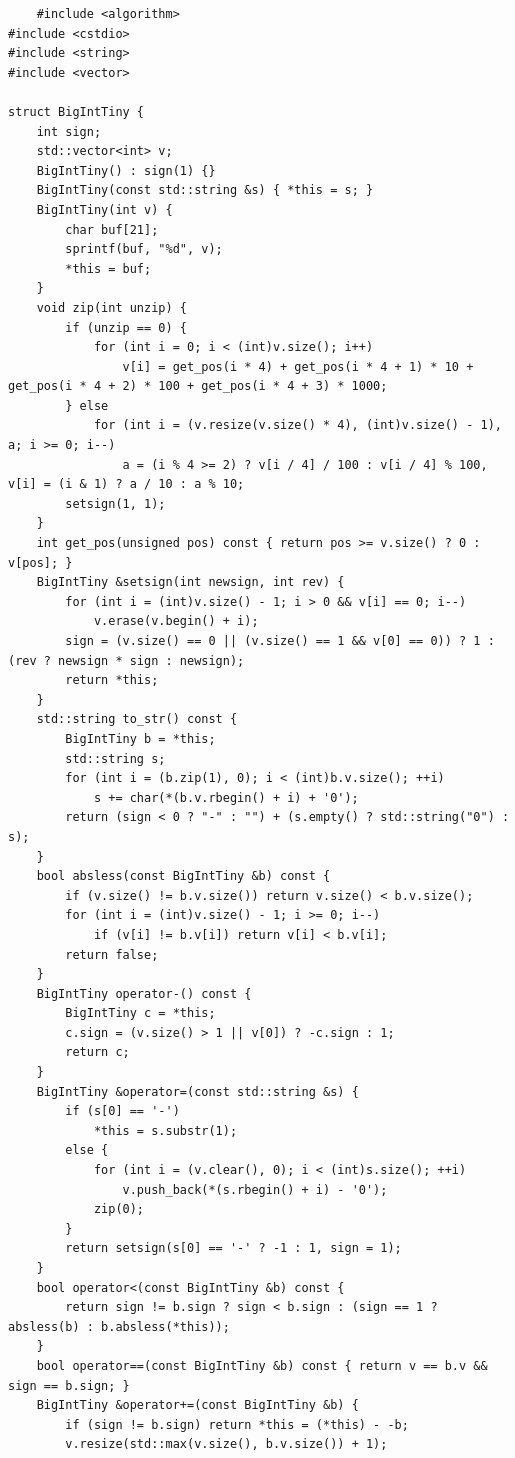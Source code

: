 \documentclass[UTF8,twoside]{ctexart}
\begin{document}
\begin{lstlisting}
    #include <algorithm>
#include <cstdio>
#include <string>
#include <vector>

struct BigIntTiny {
    int sign;
    std::vector<int> v;
    BigIntTiny() : sign(1) {}
    BigIntTiny(const std::string &s) { *this = s; }
    BigIntTiny(int v) {
        char buf[21];
        sprintf(buf, "%d", v);
        *this = buf;
    }
    void zip(int unzip) {
        if (unzip == 0) {
            for (int i = 0; i < (int)v.size(); i++)
                v[i] = get_pos(i * 4) + get_pos(i * 4 + 1) * 10 + get_pos(i * 4 + 2) * 100 + get_pos(i * 4 + 3) * 1000;
        } else
            for (int i = (v.resize(v.size() * 4), (int)v.size() - 1), a; i >= 0; i--)
                a = (i % 4 >= 2) ? v[i / 4] / 100 : v[i / 4] % 100, v[i] = (i & 1) ? a / 10 : a % 10;
        setsign(1, 1);
    }
    int get_pos(unsigned pos) const { return pos >= v.size() ? 0 : v[pos]; }
    BigIntTiny &setsign(int newsign, int rev) {
        for (int i = (int)v.size() - 1; i > 0 && v[i] == 0; i--)
            v.erase(v.begin() + i);
        sign = (v.size() == 0 || (v.size() == 1 && v[0] == 0)) ? 1 : (rev ? newsign * sign : newsign);
        return *this;
    }
    std::string to_str() const {
        BigIntTiny b = *this;
        std::string s;
        for (int i = (b.zip(1), 0); i < (int)b.v.size(); ++i)
            s += char(*(b.v.rbegin() + i) + '0');
        return (sign < 0 ? "-" : "") + (s.empty() ? std::string("0") : s);
    }
    bool absless(const BigIntTiny &b) const {
        if (v.size() != b.v.size()) return v.size() < b.v.size();
        for (int i = (int)v.size() - 1; i >= 0; i--)
            if (v[i] != b.v[i]) return v[i] < b.v[i];
        return false;
    }
    BigIntTiny operator-() const {
        BigIntTiny c = *this;
        c.sign = (v.size() > 1 || v[0]) ? -c.sign : 1;
        return c;
    }
    BigIntTiny &operator=(const std::string &s) {
        if (s[0] == '-')
            *this = s.substr(1);
        else {
            for (int i = (v.clear(), 0); i < (int)s.size(); ++i)
                v.push_back(*(s.rbegin() + i) - '0');
            zip(0);
        }
        return setsign(s[0] == '-' ? -1 : 1, sign = 1);
    }
    bool operator<(const BigIntTiny &b) const {
        return sign != b.sign ? sign < b.sign : (sign == 1 ? absless(b) : b.absless(*this));
    }
    bool operator==(const BigIntTiny &b) const { return v == b.v && sign == b.sign; }
    BigIntTiny &operator+=(const BigIntTiny &b) {
        if (sign != b.sign) return *this = (*this) - -b;
        v.resize(std::max(v.size(), b.v.size()) + 1);

\end{lstlisting}
\end{document}
